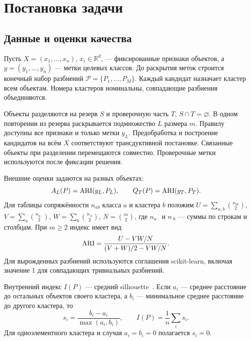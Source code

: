 \section{Постановка задачи}\label{sec:problem}
\subsection{Данные и оценки качества}
Пусть $X=(x_1,\ldots,x_n)$, $x_i\in\mathbb R^d$, --- фиксированные признаки объектов, а $y=(y_1,\ldots,y_n)$ --- метки целевых классов. До раскрытия меток строится конечный набор разбиений $\mathcal P=\{P_1,\ldots,P_M\}$. Каждый кандидат назначает кластер всем объектам. Номера кластеров номинальны, совпадающие разбиения объединяются.

Объекты разделяются на резерв $S$ и проверочную часть $T$, $S\cap T=\varnothing$. В одном повторении из резерва раскрывается подмножество $L$ размера $m$. Правилу доступны все признаки и только метки $y_L$. Предобработка и построение кандидатов на всём $X$ соответствуют трансдуктивной постановке. Связанные объекты при разделении перемещаются совместно. Проверочные метки используются после фиксации решения.

Внешние оценки задаются на разных объектах:
\begin{equation}\label{eq:two-ari}
 A_L(P)=\operatorname{ARI}(y_L,P_L),\qquad Q_T(P)=\operatorname{ARI}(y_T,P_T).
\end{equation}
Для таблицы сопряжённости $n_{ab}$ класса $a$ и кластера $b$ положим $U=\sum_{a,b}\binom{n_{ab}}2$, $V=\sum_a\binom{n_{a\cdot}}2$, $W=\sum_b\binom{n_{\cdot b}}2$, $N=\binom m2$, где $n_{a\cdot}$ и $n_{\cdot b}$ --- суммы по строкам и столбцам. При $m\ge2$ индекс имеет вид~\citep{hubert1985}
\begin{equation}
 \operatorname{ARI}=\frac{U-VW/N}{(V+W)/2-VW/N}.
\end{equation}
Для вырожденных разбиений используются соглашения scikit-learn, включая значение 1 для совпадающих тривиальных разбиений.

Внутренний индекс $I(P)$ --- средний silhouette~\citep{rousseeuw1987}. Если $a_i$ --- среднее расстояние до остальных объектов своего кластера, а $b_i$ --- минимальное среднее расстояние до другого кластера, то
\begin{equation}
 s_i=\frac{b_i-a_i}{\max(a_i,b_i)},\qquad I(P)=\frac1n\sum_i s_i.
\end{equation}
Для одноэлементного кластера и случая $a_i=b_i=0$ полагается $s_i=0$.

